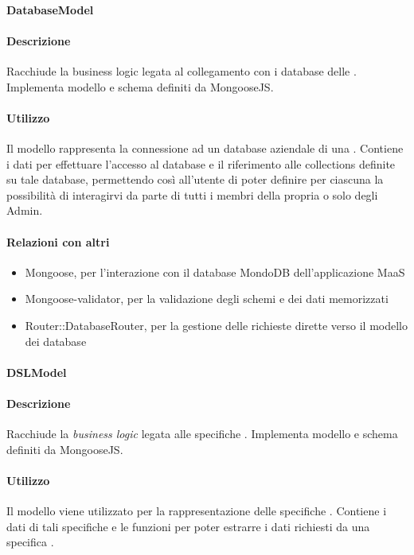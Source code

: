 \paragraph{DatabaseModel}
\paragraph*{Descrizione}

Racchiude la business logic legata al collegamento con i database delle . Implementa modello e schema definiti da MongooseJS.

\paragraph*{Utilizzo}
Il modello rappresenta la connessione ad un database aziendale di una . Contiene i dati per effettuare l'accesso al database e il riferimento alle collections definite su tale database, permettendo così all'utente di poter definire per ciascuna  la possibilità di interagirvi da parte di tutti i membri della propria  o solo degli Admin.

\paragraph*{Relazioni con altri }
\begin{itemize}
\item Mongoose, per l'interazione con il database MondoDB dell'applicazione MaaS
\item Mongoose-validator, per la validazione degli schemi e dei dati memorizzati
\item Router::DatabaseRouter, per la gestione delle richieste dirette verso il modello dei database
\end{itemize}

\paragraph{DSLModel}
\paragraph*{Descrizione}

Racchiude la \textit{business logic} legata alle specifiche . Implementa modello e schema definiti da MongooseJS.

\paragraph*{Utilizzo}
Il modello viene utilizzato per la rappresentazione delle specifiche . Contiene i dati di tali specifiche e le funzioni per poter estrarre i dati richiesti da una specifica .

